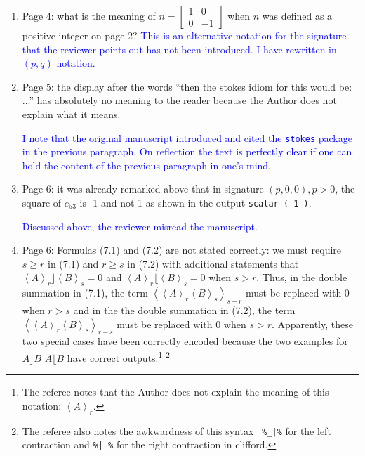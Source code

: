 \documentclass{article}
\begin{document}
\begin{enumerate}
\item Page 4: what is the meaning of
  $n=\left[\begin{array}{cc}1&0\\0&-1\end{array}\right]$ when $n$ was
  defined as a positive integer on page 2?  \textcolor{blue}{This is
    an alternative notation for the signature that the reviewer points
    out has not been introduced.  I have rewritten in $(p,q)$
    notation.}
  
  \item Page 5: the display after the words
“then the stokes idiom for this would be: ...” has absolutely no
meaning to the reader because the Author does not explain what it
means.

\textcolor{blue}{I note that the original manuscript introduced and
  cited the {\tt stokes} package in the previous paragraph.  On
  reflection the text is perfectly clear if one can hold the content
  of the previous paragraph in one's mind.}

\item Page 6: it was already remarked above that in signature $(p, 0,
  0), p > 0$, the square of $e_{53}$ is -1 and not 1 as shown in the
  output \verb+scalar ( 1 )+.

\textcolor{blue}{Discussed above, the reviewer misread the
  manuscript.}

  \item Page 6: Formulas (7.1) and (7.2) are not stated correctly: we
    must require $s\geq r$ in (7.1) and $r \geq s$ in (7.2) with
    additional statements that $\left\langle
    A\right\rangle_r\rfloor\left\langle B\right\rangle_s=0$ and
    $\left\langle A\right\rangle_r\lfloor\left\langle
    B\right\rangle_s=0$ when $s > r$.  Thus, in the double summation
    in (7.1), the term $\left\langle\left\langle
    A\right\rangle_r\left\langle B\right\rangle_s\right\rangle_{s-r}$
    must be replaced with 0 when $r > s$ and in the the double
    summation in (7.2), the term $\left\langle\left\langle
    A\right\rangle_r\left\langle B\right\rangle_s\right\rangle_{r-s}$
    must be replaced with 0 when $s>r$. Apparently, these two special
    cases have been correctly encoded because the two examples for
    $A\rfloor B$ $A\lfloor B$ have correct outputs.\footnote{The referee notes that the Author does not explain the
meaning of this notation: $\left\langle A\right\rangle_r$.}
\footnote{The referee also notes the awkwardness of this syntax {\tt
  \%\_|\%} for the left contraction and {\tt \%|\_\%} for the right
contraction in clifford.}


\end{enumerate}
\end{document}
